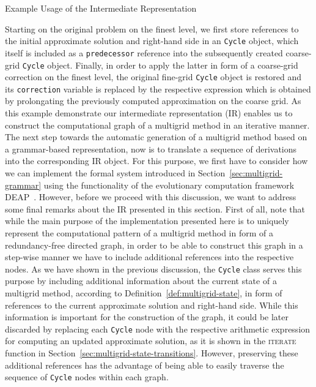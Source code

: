 \begin{listing}
	\inputminted{python}{evostencils/ir/example.py}
	\caption{Example Usage of the Intermediate Representation}
	\label{code:ir:example.py}
\end{listing}
Starting on the original problem on the finest level, we first store references to the initial approximate solution and right-hand side in an \texttt{Cycle} object, which itself is included as a \texttt{predecessor} reference into the subsequently created coarse-grid \texttt{Cycle} object.
Finally, in order to apply the latter in form of a coarse-grid correction on the finest level, the original fine-grid \texttt{Cycle} object is restored and its \texttt{correction} variable is replaced by the respective expression which is obtained by prolongating the previously computed approximation on the coarse grid.
As this example demonstrate our intermediate representation (IR) enables us to construct the computational graph of a multigrid method in an iterative manner.
The next step towards the automatic generation of a multigrid method based on a grammar-based representation, now is to translate a sequence of derivations into the corresponding IR object.
For this purpose, we first have to consider how we can implement the formal system introduced in Section~\ref{sec:multigrid-grammar} using the functionality of the evolutionary computation framework DEAP~\cite{rainville2012deap}.
However, before we proceed with this discussion, we want to address some final remarks about the IR presented in this section.
First of all, note that while the main purpose of the implementation presented here is to uniquely represent the computational pattern of a multigrid method in form of a redundancy-free directed graph, in order to be able to construct this graph in a step-wise manner we have to include additional references into the respective nodes.
As we have shown in the previous discussion, the \texttt{Cycle} class serves this purpose by including additional information about the current state of a multigrid method, according to Definition~\ref{def:multigrid-state}, in form of references to the current approximate solution and right-hand side.
While this information is important for the construction of the graph, it could be later discarded by replacing each \texttt{Cycle} node with the respective arithmetic expression for computing an updated approximate solution, as it is shown in the \textsc{iterate} function in Section~\ref{sec:multigrid-state-transitions}.
However, preserving these additional references has the advantage of being able to easily traverse the sequence of \texttt{Cycle} nodes within each graph.
